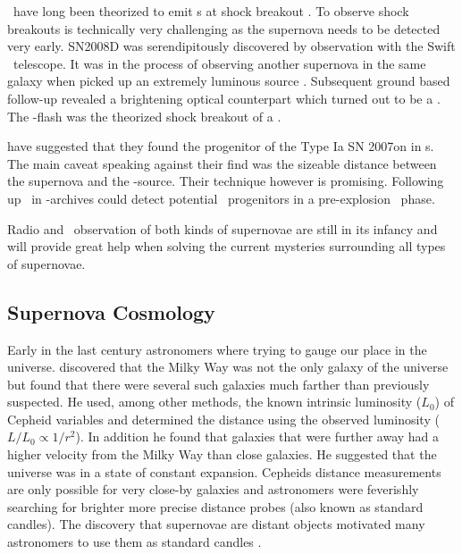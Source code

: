 \sneii\ have long been theorized to emit \xray s at shock breakout \citep{1978ApJ...223L.109K,1974ApJ...187..333C}. To observe shock breakouts is technically very challenging as the supernova needs to be detected very early. SN2008D was serendipitously discovered by observation with the Swift \xray\ telescope. It was in the process of observing another supernova  in the same galaxy when  picked up an extremely luminous source \cite{2008Natur.453..469S}. Subsequent ground based follow-up revealed a brightening optical counterpart which turned out to be a \snibc. The \xray-flash was the theorized shock breakout of a \snii.

\cite{2008Natur.451..802V} have suggested that they found the progenitor of the Type Ia SN 2007on in \xray s. The main caveat speaking against their find was the sizeable distance between the supernova and the \xray-source. Their technique however is promising. Following up \sneia\ in \xray-archives could detect potential \sneia\ progenitors in a pre-explosion \xray\ phase.

Radio and \xray\ observation of both kinds of supernovae are still in its infancy and will provide great help when solving the current mysteries surrounding all types of supernovae.

\subsection{Supernova Cosmology}
Early in the last century astronomers where trying to gauge our place in the universe. \citet{1929PNAS...15..168H} discovered that the Milky Way was not the only galaxy of the universe but found that there were several such galaxies much farther than previously suspected. He used, among other methods, the known intrinsic luminosity ($L_0$) of Cepheid variables and determined the distance using the observed luminosity ($L/L_0 \propto 1/r^2$).  In addition he found that galaxies that were further away had a higher velocity from the Milky Way than close galaxies. He suggested that the universe was in a state of constant expansion. Cepheids distance measurements are only possible for very close-by galaxies and astronomers were feverishly searching for brighter more precise distance probes (also known as standard candles). The discovery that supernovae are distant objects \citep{1934PNAS...20..254B} motivated many astronomers to use them as standard candles \cite{1938ApJ....88..285B, 1960ZA.....49..201V, 1968AJ.....73.1021K, 1999ApJ...517..565P}. 

